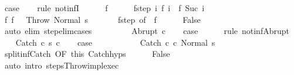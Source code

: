 \begin{isabellebody}
\ {\isacharquery}case\isanewline
\ \ \isamarkupfalse%
\ {\isacharparenleft}rule\ not{\isacharunderscore}infI{\isacharparenright}\isanewline
\ \ \ \ \isamarkupfalse%
\ f\isanewline
\ \ \ \ \isamarkupfalse%
\ f{\isacharunderscore}step{\isacharcolon}\ {\isachardoublequoteopen}{\isasymAnd}i{\isachardot}\ {\isasymGamma}{\isasymturnstile}f\ i\ {\isasymrightarrow}\ f\ {\isacharparenleft}Suc\ i{\isacharparenright}{\isachardoublequoteclose}\isanewline
\ \ \ \ \isamarkupfalse%
\ f{\isacharunderscore}{}{\isacharcolon}\ {\isachardoublequoteopen}f\ {}\ {\isacharequal}\ {\isacharparenleft}Throw{\isacharcomma}\ Normal\ s{\isacharparenright}{\isachardoublequoteclose}\ \isanewline
\ \ \ \ \isamarkupfalse%
\ f{\isacharunderscore}step\ {\isacharbrackleft}of\ {}{\isacharbrackright}\ f{\isacharunderscore}{}\isanewline
\ \ \ \ \isamarkupfalse%
\ False\isanewline
\ \ \ \ \ \ \isamarkupfalse%
\ {\isacharparenleft}auto\ elim{\isacharcolon}\ step{\isacharunderscore}elim{\isacharunderscore}cases{\isacharparenright}\isanewline
\ \ \isamarkupfalse%
\ \ \isanewline
{}\isamarkupfalse%
\isanewline
\ \ \isamarkupfalse%
\ {\isacharparenleft}Abrupt\ c{\isacharparenright}\isanewline
\ \ \isamarkupfalse%
\ {\isacharquery}case\isanewline
\ \ \ \ \isamarkupfalse%
\ {\isacharparenleft}rule\ not{\isacharunderscore}inf{\isacharunderscore}Abrupt{\isacharparenright}\isanewline
{}\isamarkupfalse%
\isanewline
\ \ \isamarkupfalse%
\ {\isacharparenleft}Catch\ c\ s\ c\isanewline
\ \ \isamarkupfalse%
\ {\isacharquery}case\isanewline
\ \ \isamarkupfalse%
\ \isanewline
\ \ \ \ \isamarkupfalse%
\ {\isachardoublequoteopen}{\isasymGamma}{\isasymturnstile}\ {\isacharparenleft}Catch\ c\ c\ Normal\ s{\isacharparenright}\ {\isasymrightarrow}\ {\isasymdots}{\isacharparenleft}{\isasyminfinity}{\isacharparenright}{\isachardoublequoteclose}\isanewline
\ \ \ \ \isamarkupfalse%
\ split{\isacharunderscore}inf{\isacharunderscore}Catch\ {\isacharbrackleft}OF\ this{\isacharbrackright}\ Catch{\isachardot}hyps\isanewline
\ \ \ \ \isamarkupfalse%
\ False\isanewline
\ \ \ \ \ \ \isamarkupfalse%
\ {\isacharparenleft}auto\ intro{\isacharcolon}\ steps{\isacharunderscore}Throw{\isacharunderscore}impl{\isacharunderscore}exec{\isacharparenright}\isanewline

\end{isabellebody}
